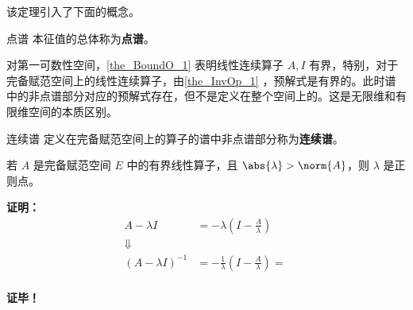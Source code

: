 该定理引入了下面的概念。
\begin{definition}{点谱}
本征值的总体称为\textbf{点谱}。
\end{definition}

对第一可数性空间，\autoref{the_BoundO_1} 表明线性连续算子 $A,I$ 有界，特别，对于完备赋范空间上的线性连续算子，由\autoref{the_InvOp_1} ，预解式是有界的。此时谱中的非点谱部分对应的预解式存在，但不是定义在整个空间上的。这是无限维和有限维空间的本质区别。

\begin{definition}{连续谱}
定义在完备赋范空间上的算子的谱中非点谱部分称为\textbf{连续谱}。
\end{definition}



\begin{theorem}{}
若 $A$ 是完备赋范空间 $E$ 中的有界线性算子，且 $\abs{\lambda}>\norm{A}$，则 $\lambda$ 是正则点。
\end{theorem}

\textbf{证明：}
\begin{equation}
\begin{aligned}
A-\lambda I&=-\lambda(I-\frac{A}{\lambda})\\
\Downarrow\\
(A-\lambda I)^{-1}&=-\frac{1}{\lambda}(I-\frac{A}{\lambda})=\\
\end{aligned}~
\end{equation}



\textbf{证毕！}